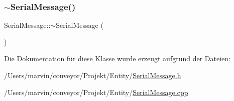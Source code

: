 \hypertarget{class_serial_message_a9bcc2b473a850ca82bf139a9fee6debb}{}\label{class_serial_message_a9bcc2b473a850ca82bf139a9fee6debb} 
\subsubsection{\texorpdfstring{$\sim$\+Serial\+Message()}{~SerialMessage()}}
{\footnotesize\ttfamily Serial\+Message\+::$\sim$\+Serial\+Message (\begin{DoxyParamCaption}{ }\end{DoxyParamCaption})\hspace{0.3cm}{\ttfamily [virtual]}}



Die Dokumentation für diese Klasse wurde erzeugt aufgrund der Dateien\+:\begin{DoxyCompactItemize}
\item 
/\+Users/marvin/conveyor/\+Projekt/\+Entity/\hyperlink{_serial_message_8h}{Serial\+Message.\+h}\item 
/\+Users/marvin/conveyor/\+Projekt/\+Entity/\hyperlink{_serial_message_8cpp}{Serial\+Message.\+cpp}\end{DoxyCompactItemize}
